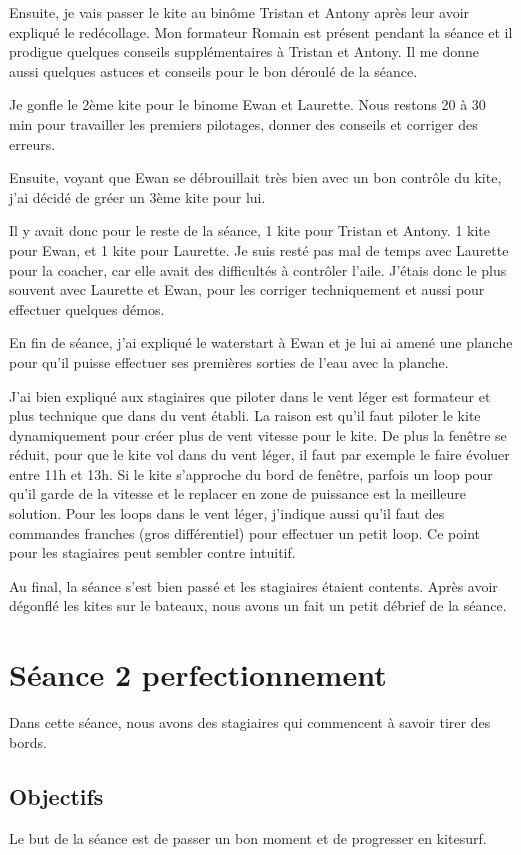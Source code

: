 \documentclass[11pt,a4paper]{report}
\begin{document}
Ensuite, je vais passer le kite au binôme Tristan et Antony après leur
avoir expliqué le redécollage. Mon formateur Romain est présent pendant la
séance et il prodigue quelques conseils supplémentaires à Tristan et Antony.
Il me donne aussi quelques astuces et conseils pour le bon déroulé de la séance.

Je gonfle le 2ème kite pour le binome Ewan et Laurette.
Nous restons 20 à 30 min pour travailler les premiers pilotages,
donner des conseils et corriger des erreurs.

Ensuite, voyant que Ewan se débrouillait très bien avec un bon contrôle du 
kite, j'ai décidé de gréer un 3ème kite pour lui.

Il y avait donc pour le reste de la séance, 1 kite pour Tristan et Antony.
1 kite pour Ewan, et 1 kite pour Laurette. Je suis resté pas mal de temps
avec Laurette pour la coacher, car elle avait des difficultés à contrôler l'aile.
J'étais donc le plus souvent avec Laurette et Ewan, pour les corriger techniquement 
et aussi pour effectuer quelques démos.

En fin de séance, j'ai expliqué le waterstart à Ewan et je lui ai
amené une planche pour qu'il puisse effectuer ses premières sorties
de l'eau avec la planche.

J'ai bien expliqué aux stagiaires que piloter dans le vent léger est
formateur et plus technique que dans du vent établi. La raison est qu'il faut
piloter le kite dynamiquement pour créer plus de vent vitesse pour le kite.
De plus la fen\^etre se réduit, pour que le kite vol dans du vent léger, 
il faut par exemple le faire évoluer entre 11h et 13h. Si le kite s'approche du 
bord de fen\^etre, parfois un loop pour qu'il garde de la vitesse et le replacer
en zone de puissance est la meilleure solution.
Pour les loops dans le vent léger, j'indique aussi qu'il faut
des commandes franches (gros différentiel) pour effectuer un petit loop.
Ce point pour les stagiaires peut sembler contre intuitif.

Au final, la séance s'est bien passé et les stagiaires étaient contents.
Après avoir dégonflé les kites sur le bateaux, nous avons un fait un
petit débrief de la séance.

\section{Séance 2 perfectionnement}
Dans cette séance, nous avons des stagiaires qui commencent à savoir tirer des bords.
\subsection{Objectifs}
Le but de la séance est de passer un bon moment et de progresser en kitesurf.
\end{document}

